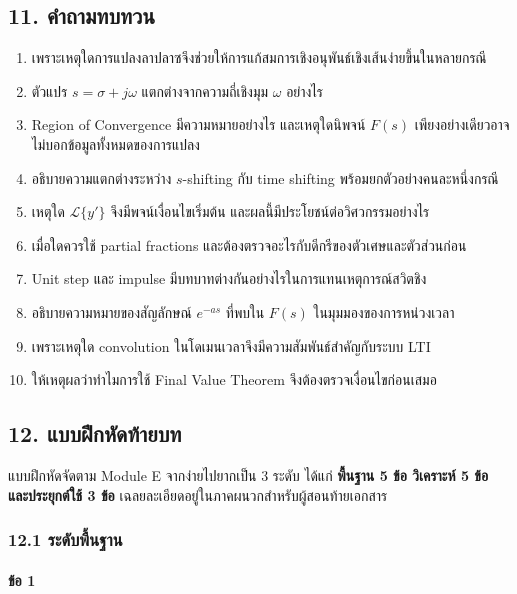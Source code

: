 \subsection{11. คำถามทบทวน}

\begin{enumerate}
    \item เพราะเหตุใดการแปลงลาปลาซจึงช่วยให้การแก้สมการเชิงอนุพันธ์เชิงเส้นง่ายขึ้นในหลายกรณี
    \item ตัวแปร $s=\sigma+j\omega$ แตกต่างจากความถี่เชิงมุม $\omega$ อย่างไร
    \item Region of Convergence มีความหมายอย่างไร และเหตุใดนิพจน์ $F(s)$ เพียงอย่างเดียวอาจไม่บอกข้อมูลทั้งหมดของการแปลง
    \item อธิบายความแตกต่างระหว่าง $s$-shifting กับ time shifting พร้อมยกตัวอย่างคนละหนึ่งกรณี
    \item เหตุใด $\mathcal{L}\{y'\}$ จึงมีพจน์เงื่อนไขเริ่มต้น และผลนี้มีประโยชน์ต่อวิศวกรรมอย่างไร
    \item เมื่อใดควรใช้ partial fractions และต้องตรวจอะไรกับดีกรีของตัวเศษและตัวส่วนก่อน
    \item Unit step และ impulse มีบทบาทต่างกันอย่างไรในการแทนเหตุการณ์สวิตชิง
    \item อธิบายความหมายของสัญลักษณ์ $e^{-as}$ ที่พบใน $F(s)$ ในมุมมองของการหน่วงเวลา
    \item เพราะเหตุใด convolution ในโดเมนเวลาจึงมีความสัมพันธ์สำคัญกับระบบ LTI
    \item ให้เหตุผลว่าทำไมการใช้ Final Value Theorem จึงต้องตรวจเงื่อนไขก่อนเสมอ
\end{enumerate}

\newpage

\subsection{12. แบบฝึกหัดท้ายบท}

แบบฝึกหัดจัดตาม Module E จากง่ายไปยากเป็น 3 ระดับ ได้แก่ \textbf{พื้นฐาน 5 ข้อ วิเคราะห์ 5 ข้อ และประยุกต์ใช้ 3 ข้อ} เฉลยละเอียดอยู่ในภาคผนวกสำหรับผู้สอนท้ายเอกสาร

\subsubsection{12.1 ระดับพื้นฐาน}

\paragraph{ข้อ 1}

